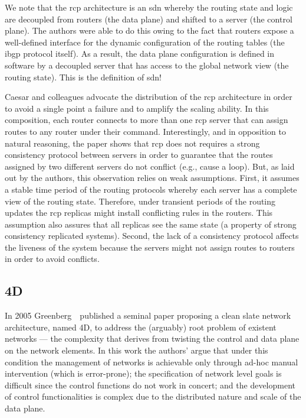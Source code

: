 We note that the \gls{rcp} architecture is an \gls{sdn} whereby the routing state and logic are decoupled from routers (the data plane) and shifted to a server (the control plane). 
The authors were able to do this owing to the fact that routers expose a well-defined interface for the dynamic configuration of the routing tables (the \gls{ibgp} protocol itself). 
As a result, the data plane configuration is defined in software by a decoupled server that has access to the global network view (the routing state). 
This is the definition of \gls{sdn}!

Caesar and colleagues advocate the distribution of the \gls{rcp} architecture in order to avoid a single point a failure and to amplify  the scaling ability. 
In this composition, each router connects to more than one \gls{rcp} server that can assign routes to any router under their command.
Interestingly, and in opposition to natural reasoning, the paper shows that \gls{rcp} does not requires a strong consistency protocol between servers in order to guarantee that the routes assigned by two different servers do not conflict (e.g., cause a loop). 
But, as laid out by the authors, this  observation relies on weak assumptions. 
First, it assumes a stable time period of the routing protocols whereby each server has a complete view of the routing state. 
Therefore, under transient periods of the routing updates the \gls{rcp} replicas might install conflicting rules in the routers. 
This assumption also assures that all replicas see the same state (a property of strong consistency replicated systems). 
Second, the lack of a consistency protocol affects the liveness of the system because the servers might not assign routes to routers in order to avoid conflicts. 

\subsection{4D}
In 2005 Greenberg~\etal\ published a seminal paper proposing a clean slate network architecture, named 4D,  to address the (arguably) root problem of existent networks --- the complexity that derives from twisting the control and data plane on the network elements. 
In this work the authors' argue that under this condition the management of networks is achievable only through ad-hoc manual intervention (which is error-prone); the specification of network level goals is difficult since the control functions do not work in concert; and the development of control functionalities is complex due to the distributed nature and scale of the data plane. 

